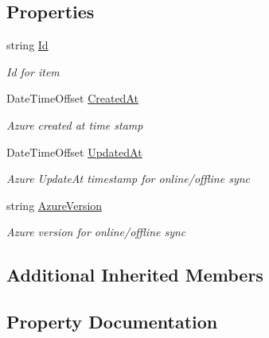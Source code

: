 \subsection*{Properties}
\begin{DoxyCompactItemize}
\item 
string \hyperlink{class_pocket_saver_1_1_models_1_1_base_data_object_ab4303cb60bc268e37fda9a6b9d1b3987}{Id}
\begin{DoxyCompactList}\small\item\em Id for item \end{DoxyCompactList}\item 
Date\+Time\+Offset \hyperlink{class_pocket_saver_1_1_models_1_1_base_data_object_a7e190cdd8cf97ceb371c81dc26bf27cb}{Created\+At}
\begin{DoxyCompactList}\small\item\em Azure created at time stamp \end{DoxyCompactList}\item 
Date\+Time\+Offset \hyperlink{class_pocket_saver_1_1_models_1_1_base_data_object_ad4f722a084f206961d65507e3f29750c}{Updated\+At}
\begin{DoxyCompactList}\small\item\em Azure Update\+At timestamp for online/offline sync \end{DoxyCompactList}\item 
string \hyperlink{class_pocket_saver_1_1_models_1_1_base_data_object_ad6a1af4f7f1b9a24e6ea2561b78948b6}{Azure\+Version}
\begin{DoxyCompactList}\small\item\em Azure version for online/offline sync \end{DoxyCompactList}\end{DoxyCompactItemize}
\subsection*{Additional Inherited Members}


\subsection{Property Documentation}
\mbox{\label{class_pocket_saver_1_1_models_1_1_base_data_object_ad6a1af4f7f1b9a24e6ea2561b78948b6}} 
